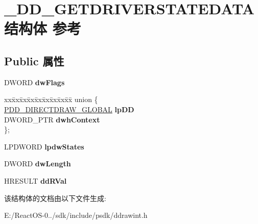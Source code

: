 \hypertarget{struct___d_d___g_e_t_d_r_i_v_e_r_s_t_a_t_e_d_a_t_a}{}\section{\+\_\+\+D\+D\+\_\+\+G\+E\+T\+D\+R\+I\+V\+E\+R\+S\+T\+A\+T\+E\+D\+A\+T\+A结构体 参考}
\label{struct___d_d___g_e_t_d_r_i_v_e_r_s_t_a_t_e_d_a_t_a}
\subsection*{Public 属性}
\begin{DoxyCompactItemize}
\item 
\mbox{\label{struct___d_d___g_e_t_d_r_i_v_e_r_s_t_a_t_e_d_a_t_a_aa6591d02039a537715e8e33ed79d0c7f}} 
D\+W\+O\+RD {\bfseries dw\+Flags}
\item 
\mbox{\label{struct___d_d___g_e_t_d_r_i_v_e_r_s_t_a_t_e_d_a_t_a_a756669184fa81fb953e2e3d8cf6cab29}} 
\begin{tabbing}
xx\=xx\=xx\=xx\=xx\=xx\=xx\=xx\=xx\=\kill
union \{\\
\>\hyperlink{struct___d_d___d_i_r_e_c_t_d_r_a_w___g_l_o_b_a_l}{PDD\_DIRECTDRAW\_GLOBAL} {\bfseries lpDD}\\
\>DWORD\_PTR {\bfseries dwhContext}\\
\}; \\

\end{tabbing}\item 
\mbox{\label{struct___d_d___g_e_t_d_r_i_v_e_r_s_t_a_t_e_d_a_t_a_aa594f5f63c9a18c789a70856348e8880}} 
L\+P\+D\+W\+O\+RD {\bfseries lpdw\+States}
\item 
\mbox{\label{struct___d_d___g_e_t_d_r_i_v_e_r_s_t_a_t_e_d_a_t_a_a1b005b64b73b85b59f1d3f983ac9aaf8}} 
D\+W\+O\+RD {\bfseries dw\+Length}
\item 
\mbox{\label{struct___d_d___g_e_t_d_r_i_v_e_r_s_t_a_t_e_d_a_t_a_ac0c3d01cb72241e7338e4a66370284cf}} 
H\+R\+E\+S\+U\+LT {\bfseries dd\+R\+Val}
\end{DoxyCompactItemize}


该结构体的文档由以下文件生成\+:\begin{DoxyCompactItemize}
\item 
E\+:/\+React\+O\+S-\/0../sdk/include/psdk/ddrawint.\+h\end{DoxyCompactItemize}
